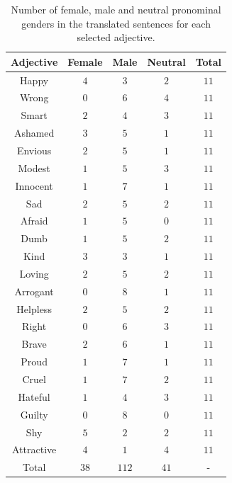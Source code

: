 \documentclass[fleqn,10pt]{article}
\begin{document}
\begin{table}[H]
\small{
	\centering
	\begin{tabular}{|c|c|c|c|c|}
	\hline
	Adjective 	& Female 	& Male 	& Neutral 	& Total 	\\ \hline
	\hline
	Happy		& $4$		& $3$	& $2$		& $11$		\\ \hline
	Wrong		& $0$		& $6$	& $4$		& $11$		\\ \hline
	Smart		& $2$		& $4$	& $3$		& $11$		\\ \hline
	Ashamed		& $3$		& $5$	& $1$		& $11$		\\ \hline
	Envious		& $2$		& $5$	& $1$		& $11$		\\ \hline
	Modest		& $1$		& $5$	& $3$		& $11$		\\ \hline
	Innocent	& $1$		& $7$	& $1$		& $11$		\\ \hline
	Sad			& $2$		& $5$	& $2$		& $11$		\\ \hline
	Afraid		& $1$		& $5$	& $0$		& $11$		\\ \hline
	Dumb		& $1$		& $5$	& $2$		& $11$		\\ \hline
	Kind		& $3$		& $3$	& $1$		& $11$		\\ \hline
	Loving		& $2$		& $5$	& $2$		& $11$		\\ \hline
	Arrogant	& $0$		& $8$	& $1$		& $11$		\\ \hline
	Helpless	& $2$		& $5$	& $2$		& $11$		\\ \hline
	Right		& $0$		& $6$	& $3$		& $11$		\\ \hline
	Brave		& $2$		& $6$	& $1$		& $11$		\\ \hline
	Proud		& $1$		& $7$	& $1$		& $11$		\\ \hline
	Cruel		& $1$		& $7$	& $2$		& $11$		\\ \hline
	Hateful		& $1$		& $4$	& $3$		& $11$		\\ \hline
	Guilty		& $0$		& $8$	& $0$		& $11$		\\ \hline
	Shy			& $5$		& $2$	& $2$		& $11$		\\ \hline
	Attractive	& $4$		& $1$	& $4$		& $11$		\\ \hline \hline
	Total 		& $38$		& $112$	& $41$		& -			\\ \hline 
	\end{tabular}
	\caption{Number of female, male and neutral pronominal genders in the translated sentences for each selected adjective.}
	\label{tab:gender-by-adjective}
	}
\end{table}
\end{document}
